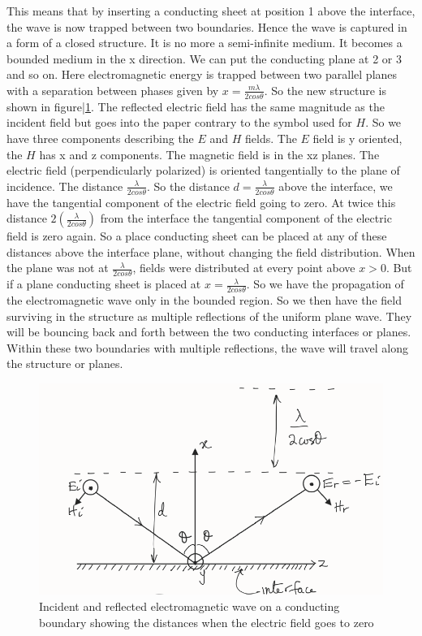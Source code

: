 This means that by inserting a conducting sheet at position 1 above the interface, the wave is now trapped between two boundaries. Hence the wave is captured in a form of a closed structure. It is no more a semi-infinite medium. It becomes a bounded medium in the x direction. We can put the conducting plane at 2 or 3 and so on. Here electromagnetic energy is trapped between two parallel planes with a separation between phases given by $x=\frac{m\lambda}{2cos\theta}$. So the new structure is shown in figure|\ref{fig:lec35fig3}. The reflected electric field has the same magnitude as the incident field but goes into the paper contrary to the symbol used for $H$. So we have three components describing the $E$ and $H$ fields. The $E$ field is y oriented, the $H$ has x and z components. The magnetic field is in the xz planes. The electric field (perpendicularly polarized) is oriented tangentially to the plane of incidence. The distance $\frac{\lambda}{2cos\theta}$. So the distance $d=\frac{\lambda}{2cos\theta}$ above the interface, we have the tangential component of the electric field going to zero. At twice this distance $2\left(\frac{\lambda}{2cos\theta}\right)$ from the interface the tangential component of the electric field is zero again. So a place conducting sheet can be placed at any of these distances above the interface plane, without changing the field distribution. When the plane was not at $\frac{\lambda}{2cos\theta}$, fields were distributed at every point above $x>0$. But if a plane conducting sheet is placed at $x=\frac{\lambda}{2cos\theta}$. So we have the propagation of the electromagnetic wave only in the bounded region. So we then have the field surviving in the structure as multiple reflections of the uniform plane wave. They will be bouncing back and forth between the two conducting interfaces or planes. Within these two boundaries with multiple reflections, the wave will travel along the structure or planes.
\begin{figure}[h]
\centering
\includegraphics[width=1\linewidth]{./graphics/lec35fig3}
\caption{Incident and reflected electromagnetic wave on a conducting boundary showing the distances when the electric field goes to zero}
\label{fig:lec35fig3}
\end{figure}

